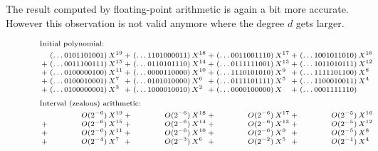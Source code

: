 \documentclass[11pt]{article}
\numberwithin{equation}{section}
\numberwithin{figure}{section}
\theoremstyle{definition}
\begin{document}
The result computed by floating-point arithmetic is again a bit more
accurate. However this observation is not valid anymore where the degree
$d$ gets larger.
%
\begin{figure}
$$\scriptsize
\begin{array}{r@{\hspace{0.2ex}}
r@{\hspace{0.5ex}}l@{\hspace{0.2ex}}
r@{\hspace{0.5ex}}l@{\hspace{0.2ex}}
r@{\hspace{0.5ex}}l@{\hspace{0.2ex}}r@{\hspace{0.5ex}}l}
\multicolumn{9}{l}{\text{Initial polynomial:}}\smallskip\\
     {}& (\ldots 0101101001) & X^{19}
   + {}& (\ldots 1101000011) & X^{18} 
   + {}& (\ldots 0011001110) & X^{17} 
   + {}& (\ldots 1001011010) & X^{16} \\
 {}+ {}& (\ldots 0011100111) & X^{15} 
   + {}& (\ldots 0110101110) & X^{14}
   + {}& (\ldots 0111111001) & X^{13}
   + {}& (\ldots 1011010111) & X^{12} \\
 {}+ {}& (\ldots 0100000100) & X^{11}
   + {}& (\ldots 0000110000) & X^{10}
   + {}& (\ldots 1110101010) & X^{9\phantom{0}}
   + {}& (\ldots 1111101100) & X^{8} \\
 {}+ {}& (\ldots 0100010001) & X^{7\phantom{0}}
   + {}& (\ldots 0101010000) & X^{6\phantom{0}}
   + {}& (\ldots 0111101111) & X^{5\phantom{0}}
   + {}& (\ldots 1100010011) & X^{4} \\
 {}+ {}& (\ldots 0100000001) & X^{3\phantom{0}}
   + {}& (\ldots 1000010010) & X^{2\phantom{0}}
   + {}& (\ldots 0000100000) & X^{\phantom{01}} 
   + {}& (\ldots 0001111110) \medskip \\
\multicolumn{9}{l}{\text{Interval (zealous) arithmetic:}}\smallskip\\
       & O(2^{-6}) & X^{19}
   + {}& O(2^{-6}) & X^{18}
   + {}& O(2^{-6}) & X^{17}
   + {}& O(2^{-5}) & X^{16} \\
 {}+ {}& O(2^{-6}) & X^{15}
   + {}& O(2^{-6}) & X^{14}
   + {}& O(2^{-6}) & X^{13}
   + {}& O(2^{-5}) & X^{12} \\
 {}+ {}& O(2^{-6}) & X^{11}
   + {}& O(2^{-6}) & X^{10}
   + {}& O(2^{-6}) & X^{9\phantom{0}}
   + {}& O(2^{-5}) & X^{8} \\
 {}+ {}& O(2^{-4}) & X^{7\phantom{0}}
   + {}& O(2^{-3}) & X^{6\phantom{0}}
   + {}& O(2^{-2}) & X^{5\phantom{0}}
   + {}& O(2^{-1}) & X^{4} \\

\end{array}$$
\end{figure}
\end{document}
